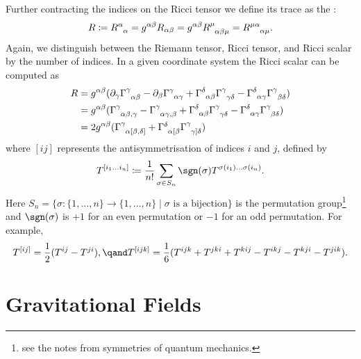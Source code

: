 \documentclass[fleqn]{NotesClass}
\newcommand*{\christoffel}[3]{\tensor{\Gamma}{^{#1}_{{#2}{#3}}}}
\begin{document}
    Further contracting the indices on the Ricci tensor we define its trace as the :
    \begin{equation}
        R \coloneqq \tensor{R}{^\alpha_\alpha} = g^{\alpha\beta}R_{\alpha\beta} = g^{\alpha\beta}\tensor{R}{^\mu_{\alpha\beta\mu}} = \tensor{R}{^{\mu\alpha}_{\alpha\mu}}.
    \end{equation}
    Again, we distinguish between the Riemann tensor, Ricci tensor, and Ricci scalar by the number of indices.
    In a given coordinate system the Ricci scalar can be computed as
    \begin{align}
        R &= g^{\alpha\beta} (\partial_\gamma \christoffel{\gamma}{\alpha}{\beta} - \partial_\beta\christoffel{\gamma}{\alpha}{\gamma} + \christoffel{\delta}{\alpha}{\beta}\christoffel{\gamma}{\gamma}{\delta} - \christoffel{\delta}{\alpha}{\gamma}\christoffel{\gamma}{\beta}{\delta})\\
        &= g^{\alpha\beta} (\christoffel{\gamma}{\alpha}{\beta,\gamma} - \christoffel{\gamma}{\alpha}{\gamma,\beta} + \christoffel{\delta}{\alpha}{\beta} \christoffel{\gamma}{\gamma}{\delta} - \christoffel{\delta}{\alpha}{\gamma}\christoffel{\gamma}{\beta}{\delta})\\
        &= 2 g^{\alpha\beta}(\tensor{\Gamma}{^\gamma_{\alpha[\beta,\delta]}} + \tensor{\Gamma}{^{\raisebox{-1.2pt}{\scriptsize\(\delta\)}\vphantom{\gamma}}_{\alpha[\beta}}\tensor{\Gamma}{^\gamma_{\gamma]\delta}})
    \end{align}
    where \([ij]\) represents the antisymmetrisation of indices \(i\) and \(j\), defined by
    \begin{equation}
        T^{[i_1\dotso i_n]} \coloneqq \frac{1}{n!} \sum_{\sigma \in S_n} \sgn(\sigma) T^{\sigma(i_1) \dotso \sigma(i_n)}.
    \end{equation}
    Here \(S_n = \{\sigma\colon \{1, \dotsc, n\} \to \{1, \dotsc, n\} \mid \sigma \text{ is a bijection}\}\) is the permutation group\footnote{see the notes from symmetries of quantum mechanics.} and \(\sgn(\sigma)\) is \(+1\) for an even permutation or \(-1\) for an odd permutation.
    For example, 
    \begin{equation}
        T^{[ij]} = \frac{1}{2}(T^{ij} - T^{ji}), \qand T^{[ijk]} = \frac{1}{6}(T^{ijk} + T^{jki} + T^{kij} - T^{ikj} - T^{kji} - T^{jik}).
    \end{equation}
    
    \chapter{Gravitational Fields}
\end{document}
